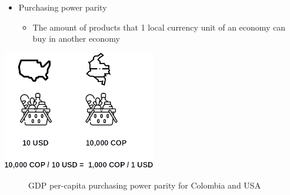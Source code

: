 \documentclass[
  ignorenonframetext,
]{beamer}
\providecommand{\tightlist}{%
  \setlength{\itemsep}{0pt}\setlength{\parskip}{0pt}}\usepackage{longtable,booktabs,array}
\begin{document}
\begin{frame}{}
\label{section-14}
\begin{itemize}
\item
  Purchasing power parity

  \begin{itemize}
  \tightlist
  \item
    The amount of products that 1 local currency unit of an economy can
    buy in another economy
  \end{itemize}
\end{itemize}

\begin{center}
\includegraphics[width=0.5\textwidth,height=\textheight]{_000_images/002_image3.png}
\end{center}
\end{frame}

\begin{frame}{}
\label{section-15}
\begin{figure}


\caption{\label{fig-real-gdp-pc-ppp-col-usa}GDP per-capita purchasing
power parity for Colombia and USA}

\end{figure}%
\end{frame}
\end{document}
